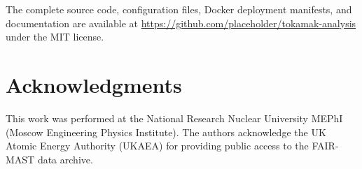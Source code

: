 \documentclass[twocolumn]{article}
\begin{document}
The complete source code, configuration files, Docker
deployment manifests, and documentation are available at
\url{https://github.com/placeholder/tokamak-analysis}
under the MIT license.

\section*{Acknowledgments}

This work was performed at the National Research Nuclear
University MEPhI (Moscow Engineering Physics Institute).
The authors acknowledge the UK Atomic Energy Authority (UKAEA)
for providing public access to the FAIR-MAST data archive.


\end{document}
